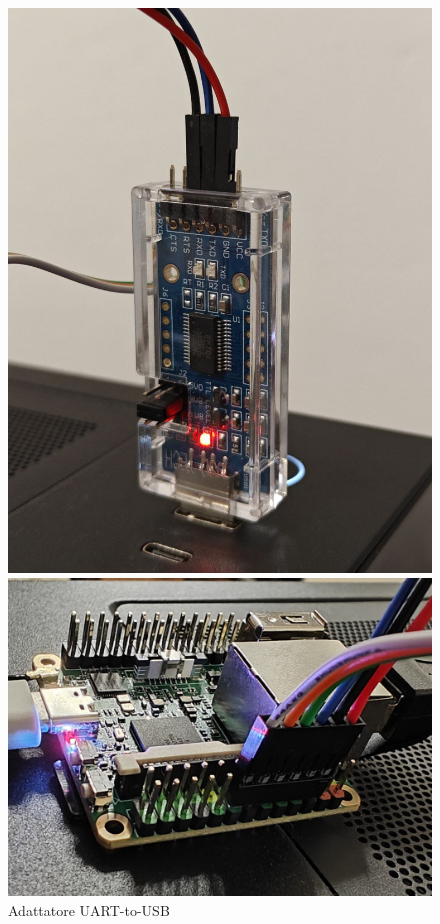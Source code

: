 \begin{figure}[!htb]
  \includegraphics[width=\linewidth]{images/uart_usb.jpg}
  \caption{Adattatore UART-to-USB}\label{fig:awesome_image1}
\endminipage\hfill
{}
  \includegraphics[width=\linewidth]{images/duo_up.jpg}

\end{figure}
